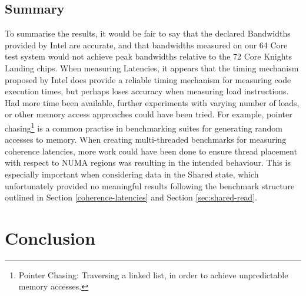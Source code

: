 \documentclass[bsc,frontabs,twoside,singlespacing,parskip,deptreport]{infthesis}     %
\begin{document}
\section{Summary}
To summarise the results, it would be fair to say that the declared Bandwidths provided by Intel are accurate, and that bandwidths measured on our 64 Core test system would not achieve peak bandwidths relative to the 72 Core Knights Landing chips. When measuring Latencies, it appears that the timing mechanism proposed by Intel\cite{code_exec_times} does provide a reliable timing mechanism for measuring code execution times, but perhaps loses accuracy when measuring load instructions. Had more time been available, further experiments with varying number of loads, or other memory access approaches could have been tried. For example, pointer chasing\footnote{Pointer Chasing: Traversing a linked list, in order to achieve unpredictable memory accesses.} is a common practise in benchmarking suites for generating random accesses to memory. When creating multi-threaded benchmarks for measuring coherence latencies, more work could have been done to ensure thread placement with respect to NUMA regions was resulting in the intended behaviour. This is especially important when considering data in the Shared state, which unfortunately provided no meaningful results following the benchmark structure outlined in Section \ref{coherence-latencies} and Section \ref{sec:shared-read}.

\chapter{Conclusion}\label{chap:conclusion}
\end{document}
